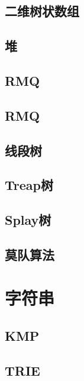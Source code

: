 \section{二维树状数组}
\raggedbottom
\hrulefill
\section{堆}
\raggedbottom
\hrulefill
\section{RMQ}
\raggedbottom
\hrulefill
\section{RMQ}
\raggedbottom
\hrulefill
\section{线段树}
\raggedbottom
\hrulefill
\section{Treap树}
\raggedbottom
\hrulefill
\section{Splay树}
\raggedbottom
\hrulefill
\section{莫队算法}
\raggedbottom
\hrulefill

\chapter{字符串}
\section{KMP}
\raggedbottom
\hrulefill
\section{TRIE}
\raggedbottom
\hrulefill
